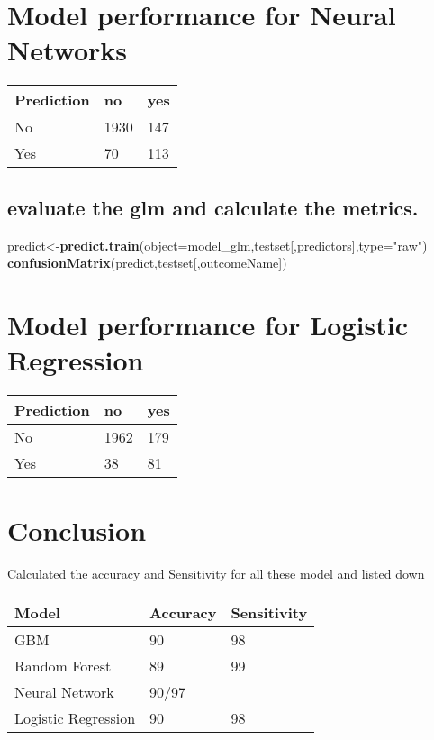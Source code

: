 \documentclass[]{article}
\newenvironment{Shaded}{\begin{snugshade}}{\end{snugshade}}
\newcommand{\KeywordTok}[1]{\textcolor[rgb]{0.13,0.29,0.53}{\textbf{#1}}}
\newcommand{\DataTypeTok}[1]{\textcolor[rgb]{0.13,0.29,0.53}{#1}}
\newcommand{\StringTok}[1]{\textcolor[rgb]{0.31,0.60,0.02}{#1}}
\newcommand{\NormalTok}[1]{#1}
\begin{document}
\section{Model performance for Neural
Networks}\label{model-performance-for-neural-networks}

\begin{longtable}[]{@{}lll@{}}
\toprule
Prediction & no & yes\tabularnewline
\midrule
\endhead
No & 1930 & 147\tabularnewline
Yes & 70 & 113\tabularnewline
\bottomrule
\end{longtable}

\subsection{evaluate the glm and calculate the
metrics.}\label{evaluate-the-glm-and-calculate-the-metrics.}

\begin{Shaded}
\begin{Highlighting}[]
\NormalTok{predict<-}\KeywordTok{predict.train}\NormalTok{(}\DataTypeTok{object=}\NormalTok{model_glm,testset[,predictors],}\DataTypeTok{type=}\StringTok{"raw"}\NormalTok{)}
\KeywordTok{confusionMatrix}\NormalTok{(predict,testset[,outcomeName])}
\end{Highlighting}
\end{Shaded}

\section{Model performance for Logistic
Regression}\label{model-performance-for-logistic-regression}

\begin{longtable}[]{@{}lll@{}}
\toprule
Prediction & no & yes\tabularnewline
\midrule
\endhead
No & 1962 & 179\tabularnewline
Yes & 38 & 81\tabularnewline
\bottomrule
\end{longtable}

\section{Conclusion}\label{conclusion}

Calculated the accuracy and Sensitivity for all these model and listed
down

\begin{longtable}[]{@{}lll@{}}
\toprule
Model & Accuracy & Sensitivity\tabularnewline
\midrule
\endhead
GBM & 90 & 98\tabularnewline
Random Forest & 89 & 99\tabularnewline
Neural Network & 90/97\tabularnewline
Logistic Regression & 90 & 98\tabularnewline
\bottomrule
\end{longtable}
\end{document}
